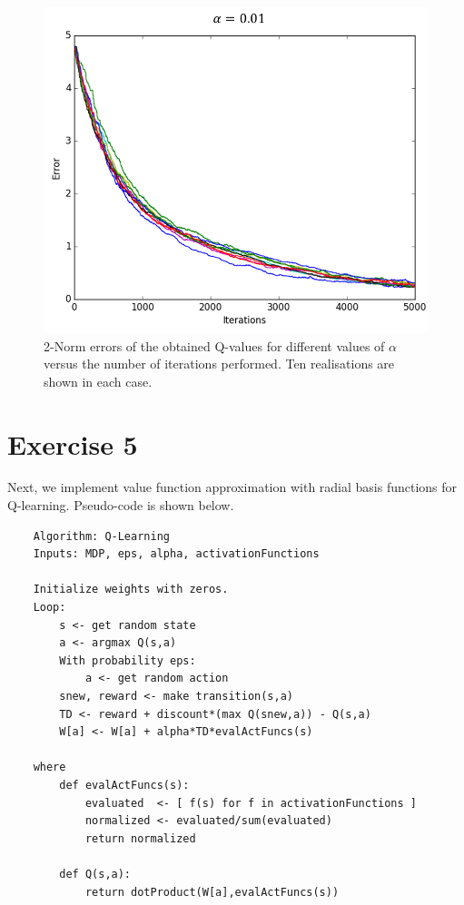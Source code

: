 \documentclass [a4paper] {report}
\begin{document}
\begin{figure}[H]
\begin{center}
			\includegraphics[scale=0.35]{Images/QErrors_0_01.png}
		\end{center}
		\label{QErrors2}
		\caption{2-Norm errors of the obtained Q-values for different values of $\alpha$ versus the number of iterations performed. Ten realisations are shown in each case.}
	\end{figure}
	
	\newpage
	\section*{Exercise 5}
	Next, we implement value function approximation with radial basis functions for Q-learning. Pseudo-code is shown below.
	
	\begin{lstlisting}
	Algorithm: Q-Learning
	Inputs: MDP, eps, alpha, activationFunctions
	
	Initialize weights with zeros.
	Loop:
		s <- get random state
		a <- argmax Q(s,a)
		With probability eps:
			a <- get random action
		snew, reward <- make transition(s,a)
		TD <- reward + discount*(max Q(snew,a)) - Q(s,a)
		W[a] <- W[a] + alpha*TD*evalActFuncs(s)
		
	where
		def evalActFuncs(s):
			evaluated  <- [ f(s) for f in activationFunctions ]
			normalized <- evaluated/sum(evaluated)
			return normalized
	
		def Q(s,a):
			return dotProduct(W[a],evalActFuncs(s)) 	
	\end{lstlisting}
	
\end{document}
